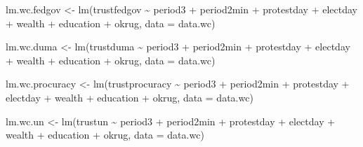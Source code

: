 \documentclass[
  letterpaper,
  DIV=11,
  numbers=noendperiod]{scrartcl}
\newenvironment{Shaded}{\begin{snugshade}}{\end{snugshade}}
\newcommand{\AttributeTok}[1]{\textcolor[rgb]{0.40,0.45,0.13}{#1}}
\newcommand{\FunctionTok}[1]{\textcolor[rgb]{0.28,0.35,0.67}{#1}}
\newcommand{\NormalTok}[1]{\textcolor[rgb]{0.00,0.23,0.31}{#1}}
\newcommand{\OtherTok}[1]{\textcolor[rgb]{0.00,0.23,0.31}{#1}}
\newcommand{\SpecialCharTok}[1]{\textcolor[rgb]{0.37,0.37,0.37}{#1}}
\begin{document}
\begin{Shaded}
\begin{Highlighting}[]
\NormalTok{lm.wc.fedgov }\OtherTok{\textless{}{-}} \FunctionTok{lm}\NormalTok{(trustfedgov }\SpecialCharTok{\textasciitilde{}}\NormalTok{ period3 }\SpecialCharTok{+}\NormalTok{ period2min }\SpecialCharTok{+}\NormalTok{ protestday }\SpecialCharTok{+}\NormalTok{ electday }\SpecialCharTok{+}
\NormalTok{                     wealth }\SpecialCharTok{+}\NormalTok{ education }\SpecialCharTok{+}\NormalTok{ okrug, }\AttributeTok{data =}\NormalTok{ data.wc) }

\NormalTok{lm.wc.duma }\OtherTok{\textless{}{-}} \FunctionTok{lm}\NormalTok{(trustduma }\SpecialCharTok{\textasciitilde{}}\NormalTok{ period3 }\SpecialCharTok{+}\NormalTok{ period2min }\SpecialCharTok{+}\NormalTok{ protestday }\SpecialCharTok{+}\NormalTok{ electday }\SpecialCharTok{+}
\NormalTok{                   wealth }\SpecialCharTok{+}\NormalTok{ education }\SpecialCharTok{+}\NormalTok{ okrug, }\AttributeTok{data =}\NormalTok{ data.wc) }

\NormalTok{lm.wc.procuracy }\OtherTok{\textless{}{-}} \FunctionTok{lm}\NormalTok{(trustprocuracy }\SpecialCharTok{\textasciitilde{}}\NormalTok{ period3 }\SpecialCharTok{+}\NormalTok{ period2min }\SpecialCharTok{+}\NormalTok{ protestday }\SpecialCharTok{+}\NormalTok{ electday }\SpecialCharTok{+}
\NormalTok{                        wealth }\SpecialCharTok{+}\NormalTok{ education }\SpecialCharTok{+}\NormalTok{ okrug, }\AttributeTok{data =}\NormalTok{ data.wc) }

\NormalTok{lm.wc.un }\OtherTok{\textless{}{-}} \FunctionTok{lm}\NormalTok{(trustun }\SpecialCharTok{\textasciitilde{}}\NormalTok{ period3 }\SpecialCharTok{+}\NormalTok{ period2min }\SpecialCharTok{+}\NormalTok{ protestday }\SpecialCharTok{+}\NormalTok{ electday }\SpecialCharTok{+}
\NormalTok{                 wealth }\SpecialCharTok{+}\NormalTok{ education }\SpecialCharTok{+}\NormalTok{ okrug, }\AttributeTok{data =}\NormalTok{ data.wc) }


\end{Highlighting}
\end{Shaded}
\end{document}
